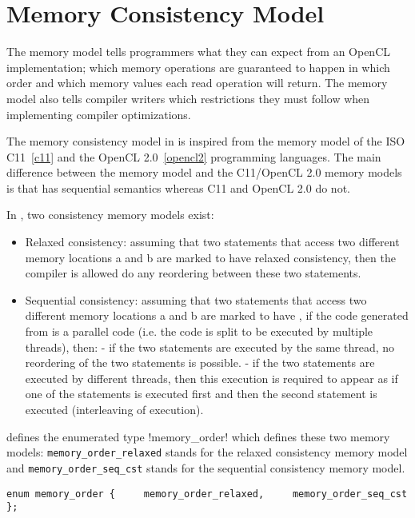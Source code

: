 \section{Memory Consistency Model}

The \pencil memory model tells programmers what they can expect from an OpenCL
implementation; which memory operations are guaranteed to happen in which order
and which memory values each read operation will return.
The memory model also tells compiler writers which restrictions they must follow
when implementing compiler optimizations.

The memory consistency model in \pencil is inspired from the memory model of
the ISO C11~\ref{c11} and the OpenCL 2.0~\ref{opencl2} programming languages.
The main difference between the \pencil memory model and the C11/OpenCL 2.0
memory models is that \pencil has sequential semantics whereas C11 and OpenCL
2.0 do not.

In \pencil, two consistency memory models exist:
\begin{itemize}
  \item Relaxed consistency: assuming that two statements that access two
  different memory locations a and b are marked to have relaxed consistency,
  then the compiler is allowed do any reordering between these
  two statements.
  \item Sequential consistency: assuming that two statements that access two
  different memory locations a and b are marked to have , if the code generated from \pencil is a parallel code
  (i.e. the code is split to be executed by multiple threads), then:
 	- if the two statements are executed by the same thread,
 	no reordering of the two statements is possible.
  	- if the two statements are executed by different threads, then this
  	execution is required to appear as if one of the statements is executed
  	first and then the second statement is executed (interleaving
  	of execution).
\end{itemize}

\pencil defines the enumerated type \lstlisting!memory_order!
which defines these two memory models:
\lstinline!memory_order_relaxed! stands for the relaxed consistency memory
model and \lstinline!memory_order_seq_cst! stands for the sequential
consistency memory model.

\lstinline!enum memory_order {
    memory_order_relaxed,
    memory_order_seq_cst
};!

